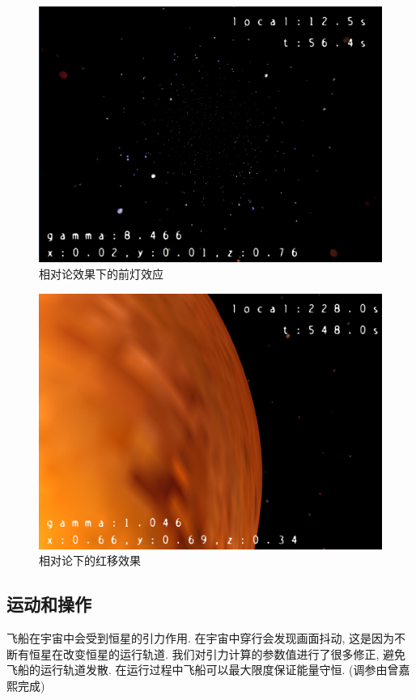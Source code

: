 \documentclass[a4paper,12pt,titlepage]{article}
\begin{document}
\begin{figure}[H]
\centering
	\includegraphics[scale=0.3]{07.png}
	\caption{相对论效果下的前灯效应}
\end{figure}
	
\begin{figure}[H]
\centering
	\includegraphics[scale=0.3]{08.png}
	\caption{相对论下的红移效果}
\end{figure}

\subsection{运动和操作}

	飞船在宇宙中会受到恒星的引力作用. 在宇宙中穿行会发现画面抖动, 这是因为不断有恒星在改变恒星的运行轨道. 我们对引力计算的参数值进行了很多修正, 避免飞船的运行轨道发散. 在运行过程中飞船可以最大限度保证能量守恒. (调参由曾嘉熙完成)
\end{document}
